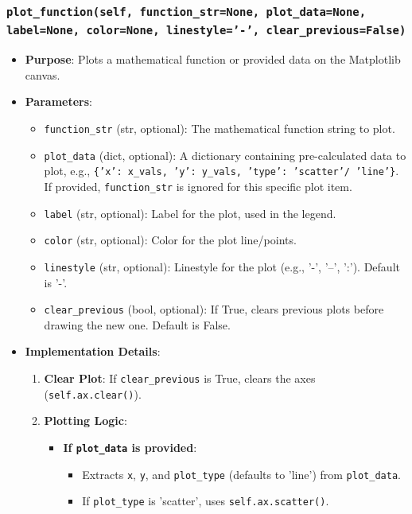 \documentclass[12pt,a4paper]{report}
\begin{document}
\subsubsection{\texttt{plot\_function(self, function\_str=None, plot\_data=None, label=None, color=None, linestyle='-', clear\_previous=False)}}
\begin{itemize}
    \item \textbf{Purpose}: Plots a mathematical function or provided data on the Matplotlib canvas.
    \item \textbf{Parameters}:
        \begin{itemize}
            \item \texttt{function\_str} (str, optional): The mathematical function string to plot.
            \item \texttt{plot\_data} (dict, optional): A dictionary containing pre-calculated data to plot, e.g., \texttt{\{'x': x\_vals, 'y': y\_vals, 'type': 'scatter'/ 'line'\}}. If provided, \texttt{function\_str} is ignored for this specific plot item.
            \item \texttt{label} (str, optional): Label for the plot, used in the legend.
            \item \texttt{color} (str, optional): Color for the plot line/points.
            \item \texttt{linestyle} (str, optional): Linestyle for the plot (e.g., '-', '--', ':'). Default is '-'.
            \item \texttt{clear\_previous} (bool, optional): If True, clears previous plots before drawing the new one. Default is False.
        \end{itemize}
    \item \textbf{Implementation Details}:
        \begin{enumerate}
            \item \textbf{Clear Plot}: If \texttt{clear\_previous} is True, clears the axes (\texttt{self.ax.clear()}).
            \item \textbf{Plotting Logic}:
                \begin{itemize}
                    \item \textbf{If \texttt{plot\_data} is provided}:
                        \begin{itemize}
                            \item Extracts \texttt{x}, \texttt{y}, and \texttt{plot\_type} (defaults to 'line') from \texttt{plot\_data}.
                            \item If \texttt{plot\_type} is 'scatter', uses \texttt{self.ax.scatter()}.

\end{itemize}
\end{itemize}
\end{enumerate}
\end{itemize}
\end{document}
